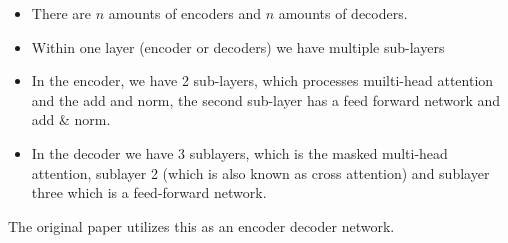 \documentclass[11pt]{article}
\begin{document}
\begin{minipage}[r]{.6\linewidth}
    \begin{itemize}
        \item There are $n$ amounts of encoders and $n$ amounts of decoders.
        \item Within one layer (encoder or decoders) we have multiple sub-layers
        \item In the encoder, we have 2 sub-layers, which processes muilti-head attention and the add and norm, the second sub-layer has a feed forward network and add \& norm.
        \item In the decoder we have 3 sublayers, which is the masked multi-head attention, sublayer 2 (which is also known as cross attention) and sublayer three which is a feed-forward network.
    \end{itemize}

    The original paper utilizes this as an encoder decoder network. 
\end{minipage}
\end{document}
